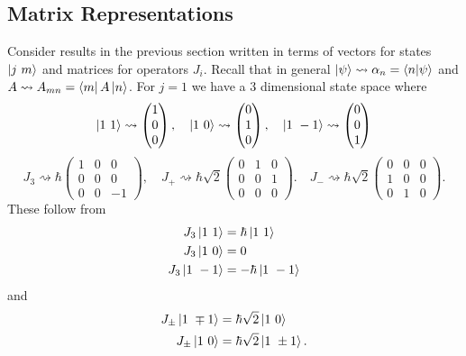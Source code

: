 \documentclass{article}
\begin{document}
\subsection{Matrix Representations}
Consider results in the previous section written in terms of vectors for states $ \ket{j\ m} $ and matrices for operators $ J_i $. Recall that in general $ \ket \psi \rightsquigarrow \alpha_n = \bra{n}\ket{\psi} $ and $ A\rightsquigarrow A_{mn} = \bra m A \ket n $. For $ j = 1 $ we have a 3 dimensional state space where
\[
	\ket{1\ 1} \rightsquigarrow \begin{pmatrix}
	  1 \\ 0 \\ 0
	\end{pmatrix},\quad	\ket{1\ 0} \rightsquigarrow \begin{pmatrix}
	  0 \\ 1 \\ 0
	\end{pmatrix},\quad 	\ket{1\ -1} \rightsquigarrow \begin{pmatrix}
	  0 \\ 0 \\ 1
	\end{pmatrix}
\]
\[
  J_3 \rightsquigarrow \hbar \begin{pmatrix}
	  1 & 0 & 0 \\
	  0 & 0 & 0 \\
	  0 & 0 & -1
  \end{pmatrix},\quad J_+ \rightsquigarrow \hbar\sqrt 2 \begin{pmatrix}
	  0 & 1 & 0 \\
	  0 & 0 & 1 \\
	  0 & 0 & 0
  \end{pmatrix}.\quad J_- \rightsquigarrow \hbar \sqrt 2 \begin{pmatrix}
	  0 & 0 & 0 \\
	  1 & 0 & 0 \\
	  0 & 1 & 0
  \end{pmatrix}.
\]
These follow from
\begin{align*}
	J_3\ket{1\ 1} &= \hbar\ket{1\ 1} \\
	J_3\ket{1\ 0} &= 0 \\
	J_3\ket{1\ -1} &= -\hbar\ket{1\ -1} 
\end{align*}
and
\begin{align*}
	J_\pm\ket{1\ \mp 1} &=\hbar\sqrt 2\ket{1\ 0} \\
	J_\pm\ket{1\ 0 } &= \hbar \sqrt 2\ket{1\ \pm 1}.
\end{align*}
\end{document}
